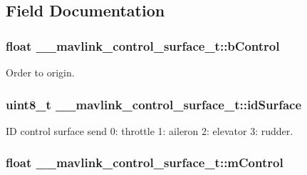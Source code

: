 \subsection{Field Documentation}
\hypertarget{struct____mavlink__control__surface__t_a8d376ebc47971a89567df02491f33f69}{
\subsubsection[{b\+Control}]{\setlength{\rightskip}{0pt plus 5cm}float \+\_\+\+\_\+mavlink\+\_\+control\+\_\+surface\+\_\+t\+::b\+Control}}\label{struct____mavlink__control__surface__t_a8d376ebc47971a89567df02491f33f69}


Order to origin. 

\hypertarget{struct____mavlink__control__surface__t_ae5bd2f54f6754620be28ff649243cb52}{
\subsubsection[{id\+Surface}]{\setlength{\rightskip}{0pt plus 5cm}uint8\+\_\+t \+\_\+\+\_\+mavlink\+\_\+control\+\_\+surface\+\_\+t\+::id\+Surface}}\label{struct____mavlink__control__surface__t_ae5bd2f54f6754620be28ff649243cb52}


I\+D control surface send 0\+: throttle 1\+: aileron 2\+: elevator 3\+: rudder. 

\hypertarget{struct____mavlink__control__surface__t_a24508303e214f7a8ac571976fe221eb1}{
\subsubsection[{m\+Control}]{\setlength{\rightskip}{0pt plus 5cm}float \+\_\+\+\_\+mavlink\+\_\+control\+\_\+surface\+\_\+t\+::m\+Control}}\label{struct____mavlink__control__surface__t_a24508303e214f7a8ac571976fe221eb1}


